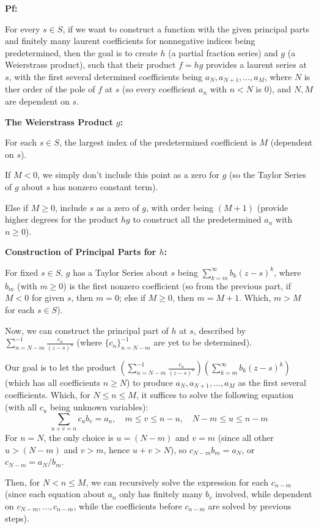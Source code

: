 \documentclass{article}
\begin{document}
\textbf{Pf:}

For every $s\in S$, if we want to construct a function with the given principal parts and finitely many laurent coefficients for nonnegative indices being predetermined,
then the goal is to create $h$ (a partial fraction series) and $g$ (a Weierstrass product), such that their product $f=hg$ provides a laurent series at $s$,
with the first several determined coefficients being $a_N, a_{N+1},...,a_M$, where $N$ is ther order of the pole of $f$ at $s$ (so every coefficient $a_n$ with $n<N$ is $0$), and $N,M$ are  dependent on $s$.

\hfil

\textbf{The Weierstrass Product $g$:}

For each $s\in S$, the largest index of the predetermined coefficient is $M$ (dependent on $s$). 

If $M<0$, we simply don't include this point as a zero for $g$ (so the Taylor Series of $g$ about $s$ has nonzero constant term).

Else if $M\geq 0$, include $s$ as a zero of $g$, with order being $(M+1)$ (provide higher degrees for the product $hg$ to construct all the predetermined $a_n$ with $n\geq 0$).

\hfil

\textbf{Construction of Principal Parts for $h$:}

For fixed $s\in S$, $g$ has a Taylor Series about $s$ being $\sum_{k=m}^{\infty}b_k(z-s)^k$, where $b_m$ (with $m\geq 0$) is the first nonzero coefficient
(so from the previous part, if $M<0$ for given $s$, then $m=0$; else if $M\geq 0$, then $m=M+1$. Which, $m>M$ for each $s\in S$).

Now, we can construct the principal part of $h$ at $s$, described by $\sum_{n=N-m}^{-1}\frac{c_n}{(z-s)^n}$ (where $\{c_n\}_{n=N-m}^{-1}$ are yet to be determined).

Our goal is to let the product $(\sum_{n=N-m}^{-1}\frac{c_n}{(z-s)^n})(\sum_{k=m}^{\infty}b_k(z-s)^k)$ (which has all coefficients $n\geq N$) to produce $a_N,a_{N+1},...,a_M$ as the first several coefficients.
Which, for $N\leq n\leq M$, it suffices to solve the following equation (with all $c_u$ being unknown variables):
$$\sum_{u+v=n}c_ub_v = a_n,\quad m\leq v\leq n-u,\quad N-m\leq u\leq n-m$$
For $n=N$, the only choice is $u=(N-m)$ and $v=m$ (since all other $u> (N-m)$ and $v> m$, hence $u+v> N$), so $c_{N-m}b_m = a_N$, or $c_{N-m}=a_N/b_m$.

Then, for $N<n\leq M$, we can recursively solve the expression for each $c_{n-m}$ (since each equation about $a_n$ only has finitely many $b_v$ involved, while dependent on $c_{N-m},...,c_{n-m}$, while the coefficients before $c_{n-m}$ are solved by previous steps).
\end{document}
